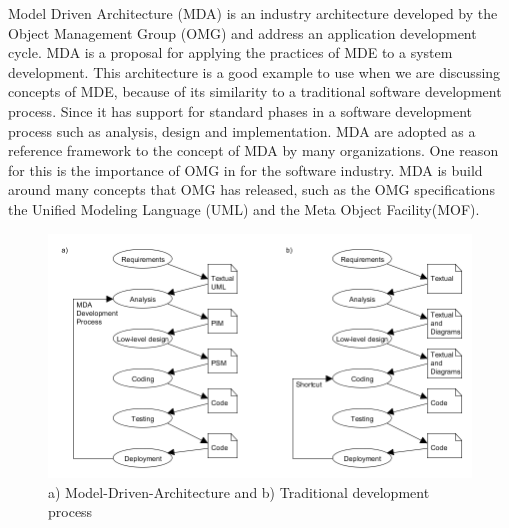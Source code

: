 Model Driven Architecture (MDA) is an industry architecture developed by the
Object Management Group (OMG) and address an application development cycle. MDA
is a proposal for applying the practices of MDE to a system development. This
architecture is a good example to use when we are discussing concepts of MDE,
because of its similarity to a traditional software development process. Since
it has support for standard phases in a software development process such as
analysis, design and implementation. MDA are adopted as a reference framework to
the concept of MDA by many organizations. One reason for this is the importance
of OMG in for the software industry. MDA is build around many concepts that OMG
has released, such as the OMG specifications the Unified Modeling Language (UML)
and the Meta Object Facility(MOF). 

\begin{figure}[H]
	\centering
	\includegraphics[scale=0.5]{./Figures/MDA.png}
	\caption[Software Development with MDA]
	{a) Model-Driven-Architecture and b) Traditional development process}
	\label{fig:MDA}
\end{figure}


